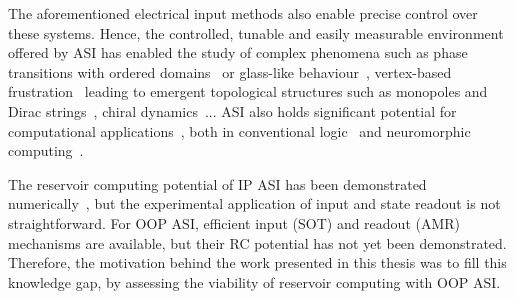 The aforementioned electrical input methods also enable precise control over these systems.
Hence, the controlled, tunable and easily measurable environment offered by ASI has enabled the study of complex phenomena such as phase transitions with ordered domains~\cite{ApparentFMpinwheel,sklenar2019field,MeltingASI,ImagingBridgedKagome,sendetskyi2019continuous,lou2023competing,branford2012emerging} or glass-like behaviour~\cite{wang2006artificial,ZeroPointEntropy}, vertex-based frustration~\cite{morrison2013unhappy,nisoli2018topologytetris} leading to emergent topological structures such as monopoles and Dirac strings~\cite{ObservationMonopoleASI,mengotti2011kagome}, chiral dynamics~\cite{branford2012emerging,EmergentChiralityRatchet}...
ASI also holds significant potential for computational applications~\cite{heyderman2022spin}, both in conventional logic~\cite{ComputationalLogic_2018,Gypens_Balanced,EngineeringRelaxationComputation} and neuromorphic computing~\cite{ASI_computation,RC_RecentAdvances}. \par
The reservoir computing potential of IP ASI has been demonstrated numerically~\cite{RC_ASI}, but the experimental application of input and state readout is not straightforward.
For OOP ASI, efficient input (SOT) and readout (AMR) mechanisms are available, but their RC potential has not yet been demonstrated.
Therefore, the motivation behind the work presented in this thesis was to fill this knowledge gap, by assessing the viability of reservoir computing with OOP ASI.

